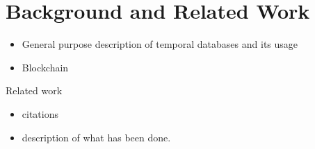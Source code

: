 \chapter{Background and Related Work}

\begin{itemize}
    \item General purpose description of temporal databases and its usage
    \item Blockchain
\end{itemize}

Related work

\begin{itemize}
    \item citations
    \item description of what has been done.
\end{itemize}
